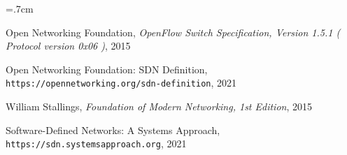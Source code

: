 \renewcommand{\bibname}{مراجع}

\begin{thebibliography}{99}

\begin{latin}

\baselineskip=.7cm

\noindent Open Networking Foundation, \textit{OpenFlow Switch Specification, Version 1.5.1 ( Protocol version 0x06 )}, 2015

\noindent Open Networking Foundation: SDN Definition, \\\texttt{https://opennetworking.org/sdn-definition}, 2021

\noindent William Stallings, \textit{Foundation of Modern Networking, 1st Edition}, 2015

\noindent Software-Defined Networks: A Systems Approach,  \\\texttt{https://sdn.systemsapproach.org}, 2021

\end{latin}

\end{thebibliography}